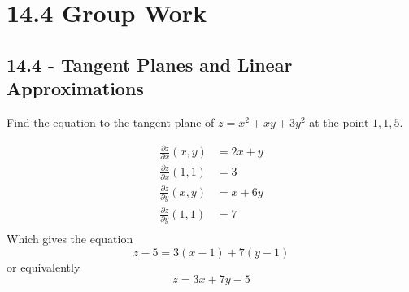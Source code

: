 \documentclass[12pt]{exam}
\newcommand{\qdate}{14.4 Group Work} %
\begin{document}
\section*{\qdate}


\subsection*{14.4 - Tangent Planes and Linear Approximations}


\begin{questions}

\question Find the equation to the tangent plane of \(z=x^2+xy+3y^2\) at the point \(1,1,5\).
    \ifprintanswers
        \begin{solution}
            \begin{align*}
                \frac{\partial z}{\partial x}(x,y) & = 2x+y\\
                \frac{\partial z}{\partial x}(1,1) & = 3\\
                \frac{\partial z}{\partial y}(x,y) & = x+6y\\
                \frac{\partial z}{\partial y}(1,1) & = 7\\
            \end{align*}
            Which gives the equation 
            \[
                z-5=3(x-1)+7(y-1)
            \]
            or equivalently 
            \[
                z=3x+7y-5
            \]
        \end{solution}
    \else
        \vfill
    \fi


\end{questions}
\end{document}
